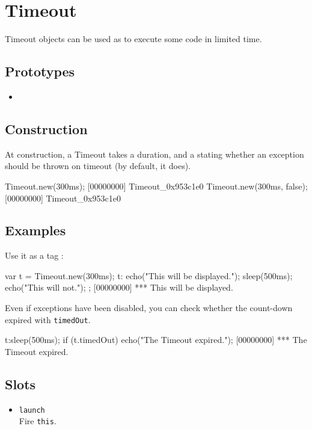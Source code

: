 \section{Timeout}

Timeout objects can be used as  to execute some
code in limited time.

\subsection{Prototypes}
\begin{itemize}
\item {}
\end{itemize}

\subsection{Construction}
At construction, a Timeout takes a duration, and a 
stating whether an exception should be thrown on timeout (by default,
it does).

\begin{urbiscript}[firstnumber=last]
Timeout.new(300ms);
[00000000] Timeout_0x953c1e0
Timeout.new(300ms, false);
[00000000] Timeout_0x953c1e0
\end{urbiscript}

\subsection{Examples}

Use it as a tag :

\begin{urbiscript}[firstnumber=last]
var t = Timeout.new(300ms);
t:{
  echo("This will be displayed.");
  sleep(500ms);
  echo("This will not.");
};
[00000000] *** This will be displayed.
\end{urbiscript}

Even if exceptions have been disabled, you can check whether the
count-down expired with \lstinline|timedOut|.

\begin{urbiscript}[firstnumber=last]
t:sleep(500ms);
if (t.timedOut)
  echo("The Timeout expired.");
[00000000] *** The Timeout expired.
\end{urbiscript}

\subsection{Slots}
\begin{itemize}
\item \lstinline|launch|\\
  Fire \lstinline|this|.
\end{itemize}

